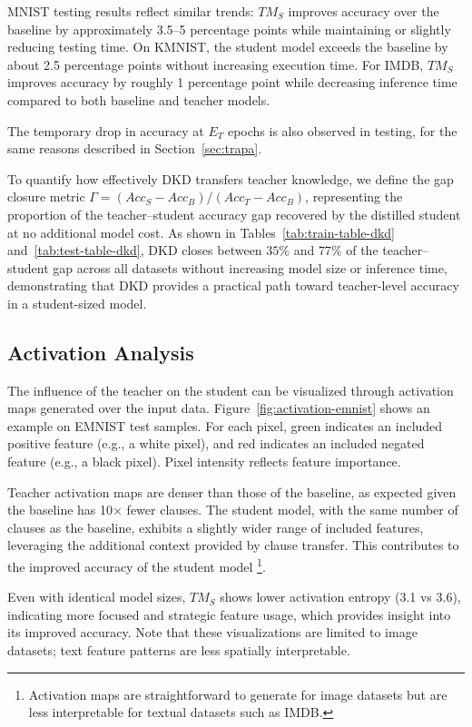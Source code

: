 \documentclass[sn-mathphys-num]{sn-jnl}%
\theoremstyle{thmstyleone}%
\theoremstyle{thmstyletwo}%
\theoremstyle{thmstylethree}%
\begin{document}
MNIST testing results reflect similar trends: $TM_S$ improves accuracy over the baseline by approximately 3.5--5 percentage points while maintaining or slightly reducing testing time. On KMNIST, the student model exceeds the baseline by about 2.5 percentage points without increasing execution time. For IMDB, $TM_S$ improves accuracy by roughly 1 percentage point while decreasing inference time compared to both baseline and teacher models.

The temporary drop in accuracy at $E_T$ epochs is also observed in testing, for the same reasons described in Section~\ref{sec:trapa}.

To quantify how effectively DKD transfers teacher knowledge, we define the
gap closure metric $\Gamma = (Acc_S - Acc_B)/(Acc_T - Acc_B)$, representing
the proportion of the teacher--student accuracy gap recovered by the distilled
student at no additional model cost. As shown in Tables~\ref{tab:train-table-dkd}
and~\ref{tab:test-table-dkd}, DKD closes between $35\%$ and $77\%$ of the teacher--student gap across all datasets without increasing model size or inference time, demonstrating that DKD provides a practical path toward teacher-level accuracy in a student-sized model.

\subsection{Activation Analysis}

The influence of the teacher on the student can be visualized through activation maps generated over the input data. Figure~\ref{fig:activation-emnist} shows an example on EMNIST test samples. For each pixel, green indicates an included positive feature (e.g., a white pixel), and red indicates an included negated feature (e.g., a black pixel). Pixel intensity reflects feature importance.

Teacher activation maps are denser than those of the baseline, as expected given the baseline has 10$\times$ fewer clauses. The student model, with the same number of clauses as the baseline, exhibits a slightly wider range of included features, leveraging the additional context provided by clause transfer. This contributes to the improved accuracy of the student model \footnote{Activation maps are straightforward to generate for image datasets but are less interpretable for textual datasets such as IMDB.}. 

Even with identical model sizes, $TM_S$ shows lower activation entropy (3.1 vs 3.6), indicating more focused and strategic feature usage, which provides insight into its improved accuracy. Note that these visualizations are limited to image datasets; text feature patterns are less spatially interpretable.
\end{document}
